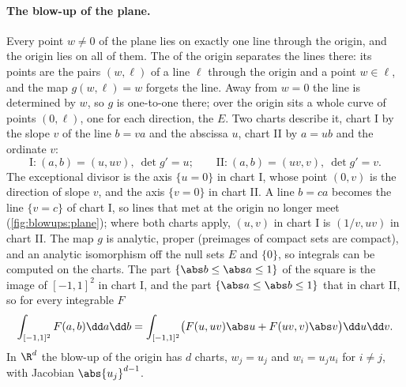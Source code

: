 \begin{refsection}
\paragraph{The blow-up of the plane.} Every point $w\ne0$ of the plane lies on exactly one line through the origin, and the origin lies on all of them. The  of the origin separates the lines there: its points are the pairs $(w,\ell)$ of a line $\ell$ through the origin and a point $w\in\ell$, and the map $g(w,\ell)=w$ forgets the line. Away from $w=0$ the line is determined by $w$, so $g$ is one-to-one there; over the origin sits a whole curve of points $(0,\ell)$, one for each direction, the  $E$. Two charts describe it, chart I by the slope $v$ of the line $b=va$ and the abscissa $u$, chart II by $a=ub$ and the ordinate $v$:
\begin{equation}\label{eq:blowups:charts}
\text{I:}\ (a,b)=(u,uv),\ \det g'=u;\qquad\text{II:}\ (a,b)=(uv,v),\ \det g'=v.
\end{equation}
The exceptional divisor is the axis $\{u=0\}$ in chart I, whose point $(0,v)$ is the direction of slope $v$, and the axis $\{v=0\}$ in chart II. A line $b=ca$ becomes the line $\{v=c\}$ of chart I, so lines that met at the origin no longer meet (\cref{fig:blowups:plane}); where both charts apply, $(u,v)$ in chart I is $(1/v,uv)$ in chart II. The map $g$ is analytic, proper (preimages of compact sets are compact), and an analytic isomorphism off the null sets $E$ and $\{0\}$, so integrals can be computed on the charts. The part $\{\abs b\le\abs a\le1\}$ of the square is the image of $[-1,1]^2$ in chart I, and the part $\{\abs a\le\abs b\le1\}$ that in chart II, so for every integrable $F$
\begin{equation}\label{eq:blowups:twocharts}
\int_{[-1,1]^2}F(a,b)\dd a\dd b=\int_{[-1,1]^2}\bigl(F(u,uv)\abs u+F(uv,v)\abs v\bigr)\dd u\dd v.
\end{equation}
In $\R^d$ the blow-up of the origin has $d$ charts, $w_j=u_j$ and $w_i=u_ju_i$ for $i\ne j$, with Jacobian $\abs{u_j}^{d-1}$.


\end{refsection}
